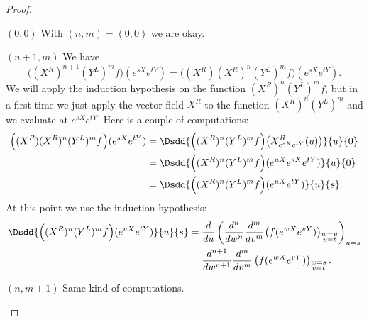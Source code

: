 \begin{proof}
    \begin{subproof}
        \item[\( (0,0)\)]
            With \( (n,m)=(0,0)\) we are okay.
        \item[\( (n+1,m)\)]
            We have
            \begin{equation}
                \Big( (X^R)^{n+1}(Y^L)^mf \Big)( e^{sX} e^{tY})=\big( (X^R)(X^R)^n(Y^L)^mf \big)( e^{sX} e^{tY}).
            \end{equation}
            We will apply the induction hypothesis on the function \( (X^R)^n(Y^L)^mf\), but in a first time we just apply the vector field \( X^R\) to the function \( (X^R)^n(Y^L)^m\) and we evaluate at \(  e^{sX} e^{tY}\). Here is a couple of computations:
            \begin{subequations}
                \begin{align}
                    \Big( (X^R)(X^R)^n(Y^L)^mf \Big)( e^{sX} e^{tY})&=\Dsdd{  \Big( (X^R)^n(Y^L)^mf \Big)\big( X^R_{ e^{sX} e^{tY}}(u) \big)  }{u}{0}\\
                    &=\Dsdd{  \Big( (X^R)^n(Y^L)^mf \Big)(  e^{uX} e^{sX} e^{tY} )  }{u}{0}\\
                    &=\Dsdd{  \Big( (X^R)^n(Y^L)^mf \Big)( e^{uX} e^{tY})  }{u}{s}.
                \end{align}
            \end{subequations}
            At this point we use the induction hypothesis:
            \begin{subequations}
                \begin{align}
                    \Dsdd{  \Big( (X^R)^n(Y^L)^mf \Big)( e^{uX} e^{tY})  }{u}{s}&=\frac{ d }{ du }\left( \frac{ d^n }{ dw^n }\frac{ d^m }{ dv^m }\big( f( e^{wX} e^{vY}) \big)_{\substack{w=u\\v=t}}  \right)_{u=s}\\
                    &=\frac{ d^{n+1} }{ dw^{n+1} }\frac{ d^m }{ dv^m }\left( f( e^{wX} e^{vY}) \right)_{\substack{w=s\\v=t}}.
                \end{align}
            \end{subequations}
        \item[\( (n,m+1)\)]
            Same kind of computations.
    \end{subproof}
\end{proof}

